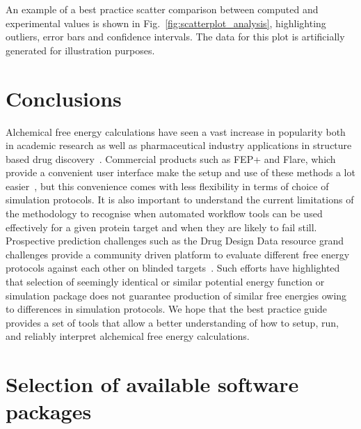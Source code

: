 \documentclass[9pt,bestpractices]{livecoms}
\begin{document}
An example of a best practice scatter comparison between computed and experimental values is shown in Fig.~\ref{fig:scatterplot_analysis}, highlighting outliers, error bars and confidence intervals. The data for this plot is artificially generated for illustration purposes.

\section{Conclusions}
\label{sec:conclusion}
Alchemical free energy calculations have seen a vast increase in popularity both in academic research as well as pharmaceutical industry applications in structure based drug discovery~\cite{schindler2020largescale, sherborne2016collaborating, wagner2017computational}. Commercial products such as FEP+ and Flare, which provide a convenient user interface make the setup and use of these methods a lot easier~\cite{wang2015accurate, kuhn2020assessment}, but this convenience comes with less flexibility in terms of choice of simulation protocols. It is also important to understand the current limitations of the methodology to recognise when automated workflow tools can be used effectively for a given protein target and when they are likely to fail still. Prospective prediction challenges such as the Drug Design Data resource grand challenges provide a community driven platform to evaluate different free energy protocols against each other on blinded targets~\cite{gaieb2018d3r, gaieb2019d3r}. Such efforts have highlighted that selection of seemingly identical or similar potential energy function or simulation package does not guarantee production of similar free energies owing to differences in simulation protocols. 
We hope that the best practice guide provides a set of tools that allow a better understanding of how to setup, run, and reliably interpret alchemical free energy calculations. 


\section{Selection of available software packages}
\end{document}
